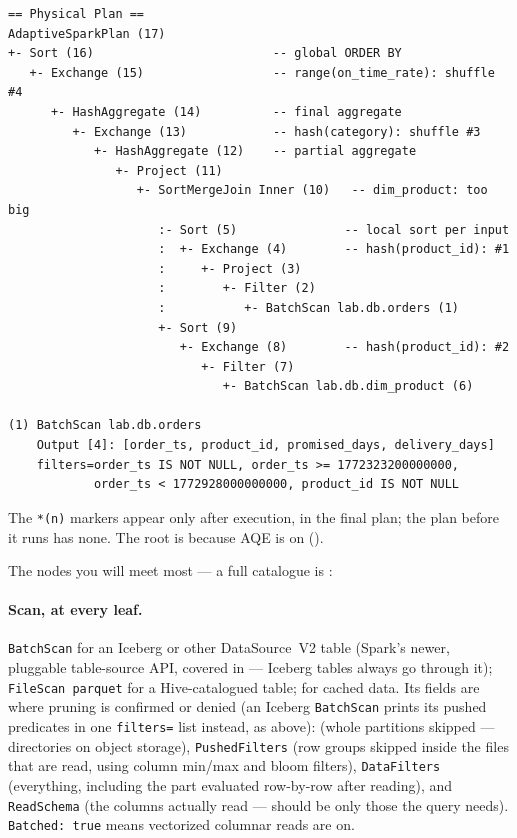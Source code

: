 \begin{lstlisting}[language=text,numbers=none,style=plan,caption={\texttt{EXPLAIN FORMATTED} on the specimen, before it runs (trimmed)},captionpos=b,label=lst:explain-anatomy]
== Physical Plan ==
AdaptiveSparkPlan (17)
+- Sort (16)                         -- global ORDER BY
   +- Exchange (15)                  -- range(on_time_rate): shuffle #4
      +- HashAggregate (14)          -- final aggregate
         +- Exchange (13)            -- hash(category): shuffle #3
            +- HashAggregate (12)    -- partial aggregate
               +- Project (11)
                  +- SortMergeJoin Inner (10)   -- dim_product: too big
                     :- Sort (5)               -- local sort per input
                     :  +- Exchange (4)        -- hash(product_id): #1
                     :     +- Project (3)
                     :        +- Filter (2)
                     :           +- BatchScan lab.db.orders (1)
                     +- Sort (9)
                        +- Exchange (8)        -- hash(product_id): #2
                           +- Filter (7)
                              +- BatchScan lab.db.dim_product (6)

(1) BatchScan lab.db.orders
    Output [4]: [order_ts, product_id, promised_days, delivery_days]
    filters=order_ts IS NOT NULL, order_ts >= 1772323200000000,
            order_ts < 1772928000000000, product_id IS NOT NULL
\end{lstlisting}

The \texttt{*(n)} markers appear only after execution, in the final plan; the
plan before it runs has none. The root is  because AQE
is on ().

The nodes you will meet most --- a full catalogue is :

\paragraph{Scan, at every leaf.} \texttt{BatchScan} for an Iceberg or other
DataSource~V2 table (Spark's newer, pluggable table-source API, covered in
 --- Iceberg tables always go through it); \texttt{FileScan
parquet} for a Hive-catalogued table;
 for cached data. Its fields are where pruning is
confirmed or denied (an Iceberg \texttt{BatchScan} prints its pushed predicates in
one \texttt{filters=} list instead, as above):  (whole partitions skipped ---
directories on object storage), \texttt{PushedFilters} (row groups skipped inside
the files that are read, using column min/max and bloom filters),
\texttt{DataFilters} (everything, including the part evaluated row-by-row after
reading), and \texttt{ReadSchema} (the columns actually read --- should be only
those the query needs). \texttt{Batched: true} means vectorized columnar reads
are on.

